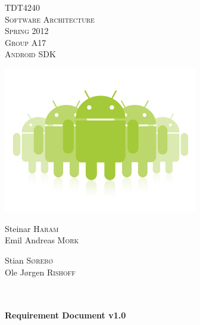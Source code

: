 \begin{titlepage}

\begin{center}

\textsc{\Large TDT4240}\\[1.0cm]

\textsc{\LARGE Software Architecture}\\[1.0cm]

\textsc{\Large Spring 2012}\\[1.0cm]

\textsc{Group A17} \\
\textsc{Android SDK}

\includegraphics[width=240pt]{./androids}\\[0.5cm]   

\begin{minipage}{0.4\textwidth}
\begin{flushleft} \large

Steinar \textsc{Haram}\\
Emil Andreas \textsc{Mork}\\

\end{flushleft}
\end{minipage}
\begin{minipage}{0.4\textwidth}
\begin{flushright} \large

Stian \textsc{Sørebø}\\
Ole Jørgen \textsc{Rishoff}

\end{flushright}
\end{minipage}\\[1.0cm]

\HRule \\[0.4cm]
{ \huge \bfseries Requirement Document v1.0}\\[0.4cm]
\HRule \\[1.5cm]


\end{center}
\end{titlepage}
